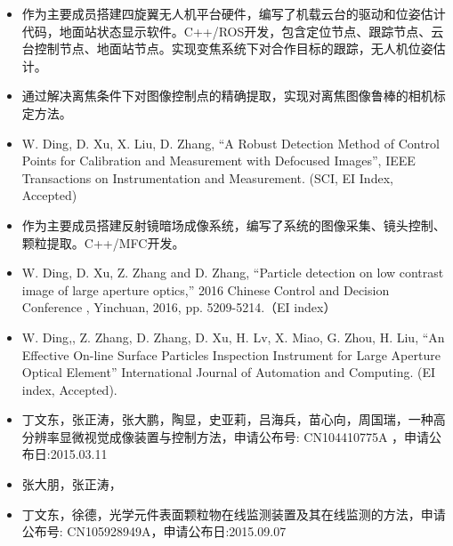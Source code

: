 \documentclass{resume}
\begin{document}
\begin{itemize}\small
  \item 作为主要成员搭建四旋翼无人机平台硬件，编写了机载云台的驱动和位姿估计代码，地面站状态显示软件。C++/ROS开发，包含定位节点、跟踪节点、云台控制节点、地面站节点。实现变焦系统下对合作目标的跟踪，无人机位姿估计。
  \item 通过解决离焦条件下对图像控制点的精确提取，实现对离焦图像鲁棒的相机标定方法。
  \item {\color{red}W. Ding}, D. Xu, X. Liu, D. Zhang, “A Robust Detection Method of Control Points for Calibration and Measurement with Defocused Images”, IEEE Transactions on Instrumentation and Measurement. (SCI, EI Index, Accepted)
\end{itemize}

\begin{itemize}\small
\item 作为主要成员搭建反射镜暗场成像系统，编写了系统的图像采集、镜头控制、颗粒提取。C++/MFC开发。
\item {\color{red}W. Ding}, D. Xu, Z. Zhang and D. Zhang, “Particle detection on low contrast image of large aperture optics,” 2016 Chinese Control and Decision Conference , Yinchuan, 2016, pp. 5209-5214.（EI index）
\item {\color{red}W. Ding},, Z. Zhang, D. Zhang, D. Xu, H. Lv, X. Miao, G. Zhou, H. Liu, “An Effective On-line Surface Particles Inspection Instrument for Large Aperture Optical Element” International Journal of Automation and Computing. (EI index, Accepted).
\item {\color{red}丁文东}，张正涛，张大鹏，陶显，史亚莉，吕海兵，苗心向，周国瑞，一种高分辨率显微视觉成像装置与控制方法，申请公布号: CN104410775A ，申请公布日:2015.03.11
\item 张大朋，张正涛，\item {\color{red}丁文东}，徐德，光学元件表面颗粒物在线监测装置及其在线监测的方法，申请公布号: CN105928949A，申请公布日:2015.09.07
\end{itemize}
\end{document}
